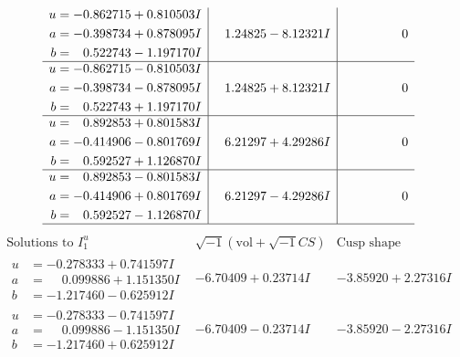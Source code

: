 \documentclass[1p]{elsarticle_modified}
\theoremstyle{definition}
\newcommand{\I}{\sqrt{-1}}
\begin{document}
$$\begin{array}{c|c|c}
\begin{aligned}
u &= -0.862715 + 0.810503 I \\
a &= -0.398734 + 0.878095 I \\
b &= \phantom{-}0.522743 - 1.197170 I\end{aligned}
 & \phantom{-}1.24825 - 8.12321 I & \phantom{-0.000000 } 0 \\ \hline\begin{aligned}
u &= -0.862715 - 0.810503 I \\
a &= -0.398734 - 0.878095 I \\
b &= \phantom{-}0.522743 + 1.197170 I\end{aligned}
 & \phantom{-}1.24825 + 8.12321 I & \phantom{-0.000000 } 0 \\ \hline\begin{aligned}
u &= \phantom{-}0.892853 + 0.801583 I \\
a &= -0.414906 - 0.801769 I \\
b &= \phantom{-}0.592527 + 1.126870 I\end{aligned}
 & \phantom{-}6.21297 + 4.29286 I & \phantom{-0.000000 } 0 \\ \hline\begin{aligned}
u &= \phantom{-}0.892853 - 0.801583 I \\
a &= -0.414906 + 0.801769 I \\
b &= \phantom{-}0.592527 - 1.126870 I\end{aligned}
 & \phantom{-}6.21297 - 4.29286 I & \phantom{-0.000000 } 0\\
 \hline 
 \end{array}$$\newpage$$\begin{array}{c|c|c}  
\text{Solutions to }I^u_{1}& \I (\text{vol} + \sqrt{-1}CS) & \text{Cusp shape}\\
 \hline 
\begin{aligned}
u &= -0.278333 + 0.741597 I \\
a &= \phantom{-}0.099886 + 1.151350 I \\
b &= -1.217460 - 0.625912 I\end{aligned}
 & -6.70409 + 0.23714 I & -3.85920 + 2.27316 I \\ \hline\begin{aligned}
u &= -0.278333 - 0.741597 I \\
a &= \phantom{-}0.099886 - 1.151350 I \\
b &= -1.217460 + 0.625912 I\end{aligned}
 & -6.70409 - 0.23714 I & -3.85920 - 2.27316 I \\ \hline\begin{aligned}

\end{aligned}
\end{array}$$
\end{document}
